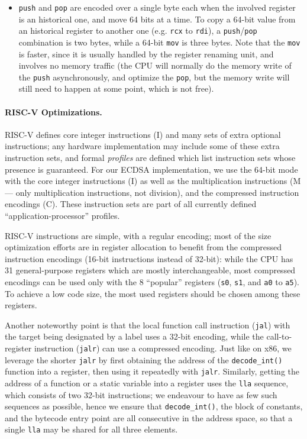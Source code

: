 \documentclass{llncs}
\begin{document}
\begin{itemize}
    \item \verb+push+ and \verb+pop+ are encoded over a single byte each
    when the involved register is an historical one, and move 64 bits at
    a time. To copy a 64-bit value from an historical register to
    another one (e.g. \verb+rcx+ to \verb+rdi+), a
    \verb+push+/\verb+pop+ combination is two bytes, while a 64-bit
    \verb+mov+ is three bytes. Note that the \verb+mov+ is faster, since
    it is usually handled by the register renaming unit, and involves no
    memory traffic (the CPU will normally do the memory write of the
    \verb+push+ asynchronously, and optimize the \verb+pop+, but the
    memory write will still need to happen at some point, which is not
    free).

\end{itemize}

\paragraph{RISC-V Optimizations.}
RISC-V defines core integer instructions (I) and many sets of extra
optional instructions; any hardware implementation may include some of
these extra instruction sets, and formal \emph{profiles} are defined
which list instruction sets whose presence is guaranteed. For our ECDSA
implementation, we use the 64-bit mode with the core integer
instructions (I) as well as the multiplication instructions (M --- only
multiplication instructions, not division), and the compressed
instruction encodings (C). These instruction sets are part of all
currently defined ``application-processor'' profiles.

RISC-V instructions are simple, with a regular encoding; most of the
size optimization efforts are in register allocation to benefit from the
compressed instruction encodings (16-bit instructions instead of
32-bit): while the CPU has 31 general-purpose registers which are mostly
interchangeable, most compressed encodings can be used only with the 8
``popular'' registers (\verb+s0+, \verb+s1+, and \verb+a0+ to
\verb+a5+). To achieve a low code size, the most used registers should
be chosen among these registers.

Another noteworthy point is that the local function call instruction
(\verb+jal+) with the target being designated by a label uses a 32-bit
encoding, while the call-to-register instruction (\verb+jalr+) can use a
compressed encoding. Just like on x86, we leverage the shorter
\verb+jalr+ by first obtaining the address of the \verb+decode_int()+
function into a register, then using it repeatedly with \verb+jalr+.
Similarly, getting the address of a function or a static variable into a
register uses the \verb+lla+ sequence, which consists of two 32-bit
instructions; we endeavour to have as few such sequences as possible,
hence we ensure that \verb+decode_int()+, the block of constants, and
the bytecode entry point are all consecutive in the address space, so
that a single \verb+lla+ may be shared for all three elements.
\end{document}
